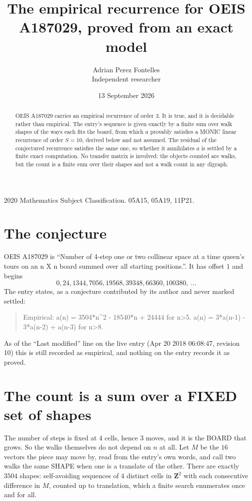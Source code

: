 \documentclass[11pt,a4paper]{article}
\title{The empirical recurrence for OEIS A187029, proved from an exact model}
\author{Adrian Perez Fontelles\\ \small Independent researcher}
\date{13 September 2026}
\theoremstyle{plain}
\theoremstyle{definition}
\begin{document}
\maketitle

\begin{abstract}
OEIS A187029 carries an empirical recurrence of order $3$. It is true, and it is
decidable rather than empirical. The entry's sequence is given exactly by a finite sum over walk shapes of the ways each fits the board, from
which $a$ provably satisfies a MONIC linear recurrence of order $S=10$, derived below and not
assumed. The residual of the conjectured recurrence satisfies the same one, so whether it
annihilates $a$ is settled by a finite exact computation. No transfer matrix is involved: the objects counted are walks, but the count is a finite sum over their shapes and not a walk count in any digraph.
\end{abstract}

\noindent\small 2020 Mathematics Subject Classification. 05A15, 05A19, 11P21.\normalsize

\section{The conjecture}

OEIS A187029 is ``Number of 4-step one or two collinear space at a time queen's tours on an n X n board summed over all starting positions.''. It has offset $1$ and begins
\[
0, 24, 1344, 7056, 19568, 39348, 66360, 100380,\ \dots
\]
The entry states, as a conjecture contributed by its author and never marked settled:
\begin{quote}
Empirical: a(n) = 3504*n\^{}2 - 18540*n + 24444 for n>5. a(n) = 3*a(n-1) - 3*a(n-2) + a(n-3) for n>8.
\end{quote}
As of the ``Last modified'' line on the live entry (Apr 20 2018 06:08:47, revision 10)
this is still recorded as empirical, and nothing on the entry records it as proved.

\section{The count is a sum over a FIXED set of shapes}

The number of steps is fixed at $4$ cells, hence $3$ moves, and it is the BOARD
that grows. So the walks themselves do not depend on $n$ at all. Let $M$ be the $16$
vectors the piece may move by, read from the entry's own words, and call two walks the same
SHAPE when one is a translate of the other. There are exactly $3504$ shapes: self-avoiding
sequences of $4$ distinct cells in $\mathbf{Z}^{2}$ with each consecutive difference in
$M$, counted up to translation, which a finite search enumerates once and for all.
\end{document}
